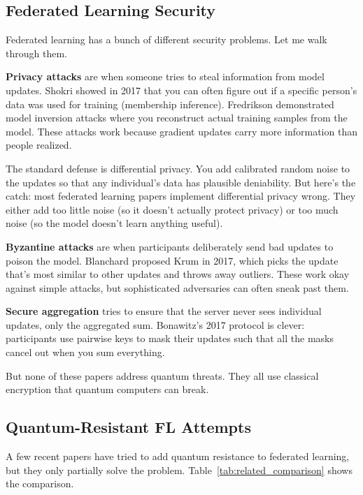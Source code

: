 \documentclass[onecolumn,11pt]{article}
\begin{document}
\subsection{Federated Learning Security}

Federated learning has a bunch of different security problems. Let me walk through them.

\textbf{Privacy attacks} are when someone tries to steal information from model updates. Shokri showed in 2017 that you can often figure out if a specific person's data was used for training (membership inference). Fredrikson demonstrated model inversion attacks where you reconstruct actual training samples from the model. These attacks work because gradient updates carry more information than people realized.

The standard defense is differential privacy. You add calibrated random noise to the updates so that any individual's data has plausible deniability. But here's the catch: most federated learning papers implement differential privacy wrong. They either add too little noise (so it doesn't actually protect privacy) or too much noise (so the model doesn't learn anything useful).

\textbf{Byzantine attacks} are when participants deliberately send bad updates to poison the model. Blanchard proposed Krum in 2017, which picks the update that's most similar to other updates and throws away outliers. These work okay against simple attacks, but sophisticated adversaries can often sneak past them.

\textbf{Secure aggregation} tries to ensure that the server never sees individual updates, only the aggregated sum. Bonawitz's 2017 protocol is clever: participants use pairwise keys to mask their updates such that all the masks cancel out when you sum everything.

But none of these papers address quantum threats. They all use classical encryption that quantum computers can break.

\subsection{Quantum-Resistant FL Attempts}

A few recent papers have tried to add quantum resistance to federated learning, but they only partially solve the problem. Table~\ref{tab:related_comparison} shows the comparison.
\end{document}
